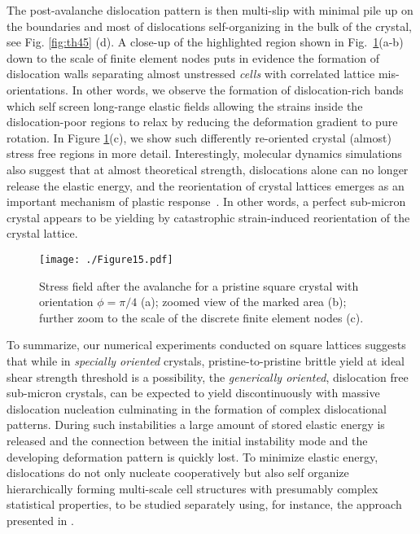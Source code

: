 \documentclass[CRPHYS,Unicode,manuscript]{cedram}
\begin{document}
 The post-avalanche  dislocation pattern is then multi-slip  with minimal pile up on the boundaries and most of dislocations self-organizing in the bulk of the crystal, see Fig. \ref{fig:th45} (d).   A close-up of the highlighted  region shown in Fig.~\ref{fig:path45zoomed}(a-b) down to the scale of finite element nodes puts in evidence the formation of  dislocation walls separating almost unstressed \emph{cells} with  correlated   lattice mis-orientations. In other words, we observe the formation of dislocation-rich bands which  self screen long-range elastic fields allowing the strains  inside the dislocation-poor regions to relax by reducing the deformation gradient to pure rotation.  In Figure \ref{fig:path45zoomed}(c), we show such differently re-oriented crystal (almost) stress free regions in more detail. Interestingly, molecular dynamics simulations also suggest that at almost theoretical strength, dislocations alone can no longer release the elastic energy, and the reorientation of   crystal lattices emerges  as an important  mechanism of plastic  response~\cite{Zepeda-Ruiz2017-gu}. In other words, a perfect sub-micron crystal appears to be yielding by catastrophic strain-induced reorientation of the crystal lattice.
 
\begin{figure}[h!]
\centering
\texttt{[image: ./Figure15.pdf]}
\caption{\scriptsize {Stress field after the avalanche for a pristine square crystal with orientation  $\phi=\pi/4$  (a);  zoomed view of the marked area (b);  further zoom to the scale of the discrete finite element nodes (c). 
}
 \label{fig:path45zoomed}}
\end{figure}
 
To summarize,  our  numerical experiments conducted on square lattices suggests that while in \emph{specially oriented} crystals, pristine-to-pristine brittle yield at ideal shear strength threshold is a possibility, the \emph{generically oriented},  dislocation free sub-micron crystals,  can be expected to  yield discontinuously with  massive dislocation nucleation culminating in the formation of complex dislocational patterns.  During such instabilities a large amount of stored elastic energy is released and the connection between the initial  instability  mode   and the developing deformation pattern is quickly  lost.  To minimize elastic energy,   dislocations do not only nucleate cooperatively but also self organize  hierarchically   forming multi-scale  cell structures with presumably complex statistical properties, to be studied separately using, for instance,  the approach  presented in \cite{Zhang2020-ax}.
\end{document}
